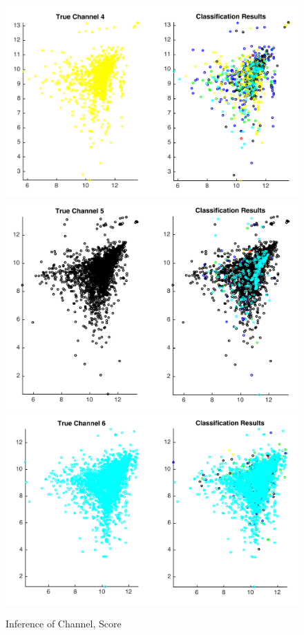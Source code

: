 \documentclass{article} %
\begin{document}
\begin{figure}[h!]
 \includegraphics[scale = 0.4]{scoreFig4.pdf}
 \includegraphics[scale = 0.4]{scoreFig5.pdf}\hspace{0.5cm}
 \includegraphics[scale = 0.4]{scoreFig6.pdf} 
 \caption{Inference of Channel, Score}
 \label{channelScore}
\end{figure}
\end{document}
